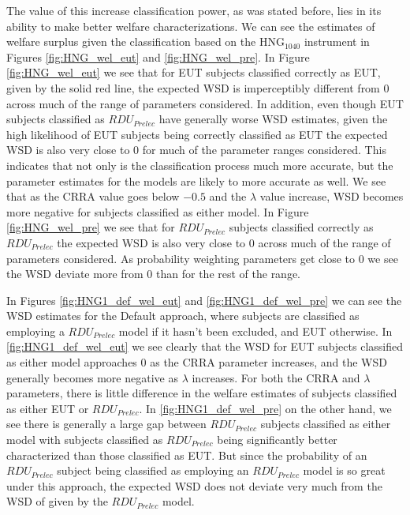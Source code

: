 \documentclass[../main.tex]{subfiles}
\begin{document}
The value of this increase classification power, as was stated before, lies in its ability to make better welfare characterizations.
We can see the estimates of welfare surplus given the classification based on the $\text{HNG}_{1040}$ instrument in Figures \ref{fig:HNG_wel_eut} and \ref{fig:HNG_wel_pre}.
In Figure \ref{fig:HNG_wel_eut} we see that for EUT subjects classified correctly as EUT, given by the solid red line, the expected WSD is imperceptibly different from 0 across much of the range of parameters considered.
In addition, even though EUT subjects classified as $\mathit{RDU_{Prelec}}$ have generally worse WSD estimates, given the high likelihood of EUT subjects being correctly classified as EUT the expected WSD is also very close to 0 for much of the parameter ranges considered.
This indicates that not only is the classification process much more accurate, but the parameter estimates for the models are likely to more accurate as well.
We see that as the CRRA value goes below $-0.5$ and the $\lambda$ value increase, WSD becomes more negative for subjects classified as either model.
In Figure \ref{fig:HNG_wel_pre} we see that for $\mathit{RDU_{Prelec}}$ subjects classified correctly as $\mathit{RDU_{Prelec}}$ the expected WSD is also very close to 0 across much of the range of parameters considered.
As probability weighting parameters get close to 0 we see the WSD deviate more from 0 than for the rest of the range. 

In Figures \ref{fig:HNG1_def_wel_eut} and \ref{fig:HNG1_def_wel_pre} we can see the WSD estimates for the Default approach, where subjects are classified as employing a $\mathit{RDU_{Prelec}}$ model if it hasn't been excluded, and EUT otherwise.
In \ref{fig:HNG1_def_wel_eut} we see clearly that the WSD for EUT subjects classified as either model approaches 0 as the CRRA parameter increases, and the WSD generally becomes more negative as $\lambda$ increases.
For both the CRRA and $\lambda$ parameters, there is little difference in the welfare estimates of subjects classified as either EUT or $\mathit{RDU_{Prelec}}$.
In \ref{fig:HNG1_def_wel_pre} on the other hand, we see there is generally a large gap between $\mathit{RDU_{Prelec}}$ subjects classified as either model with subjects classified as $\mathit{RDU_{Prelec}}$ being significantly better characterized than those classified as EUT.
But since the probability of an $\mathit{RDU_{Prelec}}$ subject being classified as employing an $\mathit{RDU_{Prelec}}$ model is so great under this approach, the expected WSD does not deviate very much from the WSD of given by the $\mathit{RDU_{Prelec}}$ model.
\end{document}
